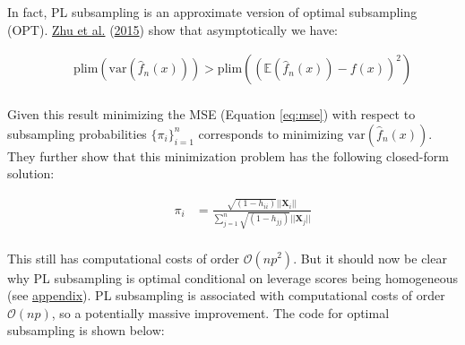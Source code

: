 \documentclass[
]{book}
\begin{document}
In fact, PL subsampling is an approximate version of optimal subsampling (OPT). \protect\hyperlink{ref-zhu2015optimal}{Zhu et al.} (\protect\hyperlink{ref-zhu2015optimal}{2015}) show that asymptotically we have:

\[
\begin{equation} 
\begin{aligned}
&&\text{plim} \left( \text{var} (\hat{f}_n(x)) \right) > \text{plim} \left(\left( \mathbb{E} \left( \hat{f}_n(x) \right) - f(x) \right)^2 \right)  \\
\end{aligned}
\label{eq:plim}
\end{equation}
\]

Given this result minimizing the MSE (Equation \eqref{eq:mse}) with respect to subsampling probabilities \(\{\pi_i\}^n_{i=1}\) corresponds to minimizing \(\text{var} (\hat{f}_n(x))\). They further show that this minimization problem has the following closed-form solution:

\[
\begin{equation} 
\begin{aligned}
&& \pi_i&= \frac{\sqrt{(1-h_{ii})}||\mathbf{X}_i||}{\sum_{j=1}^n\sqrt{(1-h_{jj})}||\mathbf{X}_j||}\\
\end{aligned}
\label{eq:opt}
\end{equation}
\]

This still has computational costs of order \(\mathcal{O}(np^2)\). But it should now be clear why PL subsampling is optimal conditional on leverage scores being homogeneous (see \protect\hyperlink{app-pl}{appendix}). PL subsampling is associated with computational costs of order \(\mathcal{O}(np)\), so a potentially massive improvement. The code for optimal subsampling is shown below:
\end{document}
